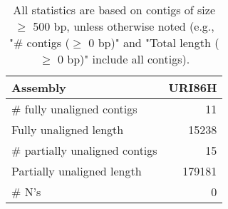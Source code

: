 \documentclass[12pt,a4paper]{article}
\begin{document}
\begin{table}[ht]
\begin{center}
\caption{All statistics are based on contigs of size $\geq$ 500 bp, unless otherwise noted (e.g., "\# contigs ($\geq$ 0 bp)" and "Total length ($\geq$ 0 bp)" include all contigs).}
\begin{tabular}{|l*{1}{|r}|}
\hline
Assembly & URI86H \\ \hline
\# fully unaligned contigs & 11 \\ \hline
Fully unaligned length & 15238 \\ \hline
\# partially unaligned contigs & 15 \\ \hline
Partially unaligned length & 179181 \\ \hline
\# N's & 0 \\ \hline
\end{tabular}
\end{center}
\end{table}
\end{document}
